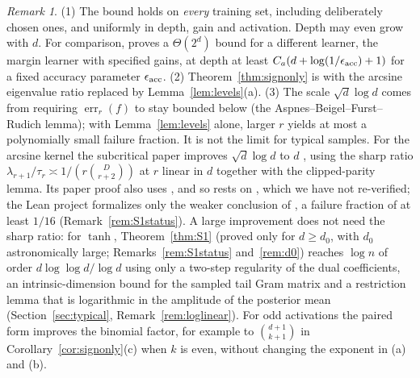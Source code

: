 \documentclass[11pt]{article}
\theoremstyle{definition}\newtheorem{assumption}[theorem]{Assumption}
\theoremstyle{remark}\newtheorem{remark}[theorem]{Remark}
\DeclareMathOperator{\err}{err}
\begin{document}
\begin{remark}\label{rem:signonly}
(1) The bound holds on \emph{every} training set, including deliberately
chosen ones, and uniformly in depth, gain and activation. Depth may even
grow with $d$. For comparison, \cite[Theorem~7.1]{nngpnote} proves a
$\Theta(2^d)$ bound for a different learner, the margin learner with
specified gains, at depth at least $C_a(d+\log(1/\epsilon_{\rm acc})+1)$
for a fixed accuracy parameter $\epsilon_{\rm acc}$. (2) Theorem~\ref{thm:signonly} is
\cite[Proposition~3]{beyondparity} with the arcsine eigenvalue ratio
replaced by Lemma~\ref{lem:levels}(a). (3) The scale $\sqrt d\log d$
comes from requiring $\err_r(f)$ to stay bounded below (the
Aspnes--Beigel--Furst--Rudich lemma); with Lemma~\ref{lem:levels} alone,
larger $r$ yields at most a polynomially small failure fraction. It is not
the limit for typical samples. For the arcsine kernel the subcritical paper
improves $\sqrt d\log d$ to $d$ \cite[Theorem~10.2]{subcritical}, using the
sharp ratio $\lambda_{r+1}/\tau_r\asymp1/(r\binom D{r+2})$ at $r$ linear in
$d$ together with the clipped-parity lemma. Its paper proof also uses
\cite[Lemma~4.4]{subcritical}, and so rests on
\cite[Lemma~4.1]{subcritical}, which we have not re-verified; the Lean
project formalizes only the weaker conclusion of
\cite[Theorem~1.1]{subcritical}, a failure fraction of at least $1/16$
(Remark~\ref{rem:S1status}). A large improvement does not
need the sharp ratio: for $\tanh$, Theorem~\ref{thm:S1} (proved only for
$d\ge d_0$, with $d_0$ astronomically large; Remarks~\ref{rem:S1status}
and~\ref{rem:d0}) reaches
$\log n$ of order $d\log\log d/\log d$ using only a two-step regularity of
the dual coefficients, an intrinsic-dimension bound for the sampled tail
Gram matrix and a restriction lemma that is logarithmic in the amplitude of
the posterior mean (Section~\ref{sec:typical}, Remark~\ref{rem:loglinear}).
For odd
activations the paired form improves the binomial factor, for example to
$\binom{d+1}{k+1}$ in Corollary~\ref{cor:signonly}(c) when $k$ is even,
without changing the exponent in (a) and (b).
\end{remark}
\end{document}
